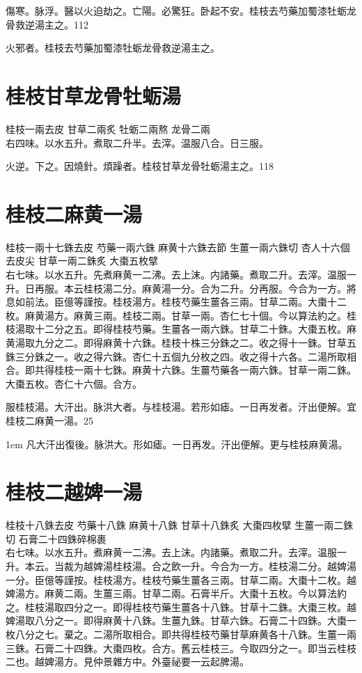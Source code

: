 傷寒。脉浮。醫以火迫劫之。亡陽。{\khaaitp 必}驚狂。卧起不安。桂枝去芍藥加蜀漆牡蛎龙骨救逆湯主之。112

火邪者。桂枝去芍藥加蜀漆牡蛎龙骨救逆湯主之。

\section{桂枝甘草龙骨牡蛎湯}

桂枝{\scriptsize 一兩去皮} 甘草{\scriptsize 二兩炙} 牡蛎{\scriptsize 二兩熬} 龙骨{\scriptsize 二兩}\\
右四味。以水五升。煮取二升半。去滓。温服八合。日三服。

火逆。下之。因燒針。煩躁者。桂枝甘草龙骨牡蛎湯主之。118

\section{桂枝二麻黄一湯}

桂枝{\scriptsize 一兩十七銖去皮} 芍藥{\scriptsize 一兩六銖} 麻黄{\scriptsize 十六銖去節} 生薑{\scriptsize 一兩六銖切} 杏人{\scriptsize 十六個去皮尖} 甘草{\scriptsize 一兩二銖炙} 大棗{\scriptsize 五枚擘}\\
右七味。以水五升。先煮麻黄一二沸。去上沫。内諸藥。煮取二升。去滓。温服一升。日再服。本云桂枝湯二分。麻黄湯一分。合为二升。分再服。今合为一方。將息如前法。{\scriptsize 臣億等謹按。桂枝湯方。桂枝芍藥生薑各三兩。甘草二兩。大棗十二枚。麻黄湯方。麻黄三兩。桂枝二兩。甘草一兩。杏仁七十個。今以算法約之。桂枝湯取十二分之五。即得桂枝芍藥。生薑各一兩六銖。甘草二十銖。大棗五枚。麻黄湯取九分之二。即得麻黄十六銖。桂枝十株三分銖之二。收之得十一銖。甘草五銖三分銖之一。收之得六銖。杏仁十五個九分枚之四。收之得十六各。二湯所取相合。即共得桂枝一兩十七銖。麻黄十六銖。生薑芍藥各一兩六銖。甘草一兩二銖。大棗五枚。杏仁十六個。合方。}{\zhaoben}

服桂枝湯。大汗出。脉洪大者。与桂枝湯。若形如瘧。一日再发者。汗出便解。宜桂枝二麻黄一湯。25

\hangindent 1em
凡大汗出復後。脉洪大。形如瘧。一日再发。汗出便解。更与桂枝麻黄湯。{\yixin}

\section{桂枝二越婢一湯}

桂枝{\scriptsize 十八銖去皮} 芍藥{\scriptsize 十八銖} 麻黄{\scriptsize 十八銖} 甘草{\scriptsize 十八銖炙} 大棗{\scriptsize 四枚擘} 生薑{\scriptsize 一兩二銖切} 石膏{\scriptsize 二十四銖碎棉裹}\\
右七味。以水五升。煮麻黄一二沸。去上沫。内諸藥。煮取二升。去滓。温服一升。本云。当裁为越婢湯桂枝湯。合{\khaaitp 之}飲一升。今合为一方。桂枝湯二分。越婢湯一分。{\scriptsize 臣億等謹按。桂枝湯方。桂枝芍藥生薑各三兩。甘草二兩。大棗十二枚。越婢湯方。麻黄二兩。生薑三兩。甘草二兩。石膏半斤。大棗十五枚。今以算法約之。桂枝湯取四分之一。即得桂枝芍藥生薑各十八銖。甘草十二銖。大棗三枚。越婢湯取八分之一。即得麻黄十八銖。生薑九銖。甘草六銖。石膏二十四銖。大棗一枚八分之七。棄之。二湯所取相合。即共得桂枝芍藥甘草麻黄各十八銖。生薑一兩三銖。石膏二十四銖。大棗四枚。合方。舊云桂枝三。今取四分之一。即当云桂枝二也。越婢湯方。見仲景雜方中。外臺祕要一云起脾湯。}


